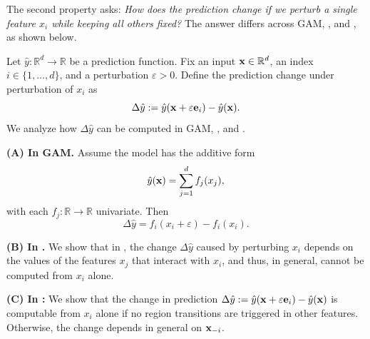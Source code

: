 The second property asks: \emph{How does the prediction change if we perturb a single feature \( x_i \) while keeping all others fixed?} The answer differs across GAM, \gamm, and \method{}, as shown below.

\begin{proposition}
Let \( \hat{y} : \mathbb{R}^d \to \mathbb{R} \) be a prediction function. Fix an input \( \mathbf{x} \in \mathbb{R}^d \), an index \( i \in \{1, \dots, d\} \), and a perturbation \( \varepsilon > 0 \). Define the prediction change under perturbation of \( x_i \) as
\[
\Delta \hat{y} := \hat{y}(\mathbf{x} + \varepsilon \mathbf{e}_i) - \hat{y}(\mathbf{x}).
\]
We analyze how \( \Delta \hat{y} \) can be computed in GAM, \gamm, and \method{}.

\textbf{(A) In GAM.}
Assume the model has the additive form
\[
\hat{y}(\mathbf{x}) = \sum_{j=1}^d f_j(x_j),
\]
with each \( f_j : \mathbb{R} \to \mathbb{R} \) univariate. Then
\[
\Delta \hat{y} = f_i(x_i + \varepsilon) - f_i(x_i).
\]

\textbf{(B) In \gamm.}
We show that in \gamm, the change \( \Delta \hat{y} \) caused by perturbing \( x_i \) depends on the values of the features \( x_j \) that interact with \( x_i \), and thus, in general, cannot be computed from \( x_i \) alone.

\textbf{(C) In \method{}:} We show that the change in prediction \( \Delta \hat{y} := \hat{y}(\mathbf{x} + \varepsilon \mathbf{e}_i) - \hat{y}(\mathbf{x}) \) is computable from \( x_i \) alone if no region transitions are triggered in other features. Otherwise, the change depends in general on \( \mathbf{x}_{-i} \).

\end{proposition}

